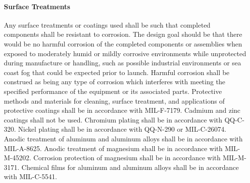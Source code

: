 \documentclass[12pt]{article}
\begin{document}
\paragraph{Surface Treatments} %
Any surface treatments or coatings used shall be such that completed components shall be resistant to corrosion. 
The design goal should be that there would be no harmful corrosion of the completed components or assemblies when exposed to moderately humid or mildly corrosive environments while unprotected during manufacture or handling, such as possible industrial environments or sea coast fog that could be expected prior to launch. 
Harmful corrosion shall be construed as being any type of corrosion which interferes with meeting the specified performance of the equipment or its associated parts. 
Protective methods and materials for cleaning, surface treatment, and applications of protective coatings shall be in accordance with MIL-F-7179. 
Cadmium and zinc coatings shall not be used. 
Chromium plating shall be in accordance with QQ-C-320. 
Nickel plating shall be in accordance with QQ-N-290 or MIL-C-26074. 
Anodic treatment of aluminum and aluminum alloys shall be in accordance with MIL-A-8625. 
Anodic treatment of magnesium shall be in accordance with MIL-M-45202.
Corrosion protection of magnesium shall be in accordance with MIL-M-3171. 
Chemical films for aluminum and aluminum alloys shall be in accordance with MIL-C-5541.
\end{document}
